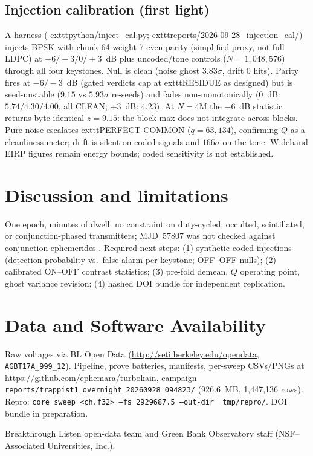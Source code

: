 \documentclass[twocolumn]{aastex631}
\begin{document}
\subsection{Injection calibration (first light)}
\label{sec:inject}
A harness (	exttt{python/inject\_cal.py}; 	exttt{reports/2026-09-28\_injection\_cal/}) injects BPSK with chunk-64 weight-7 even parity (simplified proxy, not full LDPC) at $-6/-3/0/+3$~dB plus uncoded/tone controls ($N=1{,}048{,}576$) through all four keystones. Null is clean (noise ghost $3.83\sigma$, drift 0 hits). Parity fires at $-6/-3$~dB (gated verdicts cap at 	exttt{RESIDUE} as designed) but is seed-unstable ($9.15$ vs $5.93\sigma$ re-seeds) and fades non-monotonically ($0$~dB: $5.74/4.30/4.00$, all CLEAN; $+3$~dB: $4.23$). At $N=4$M the $-6$~dB statistic returns byte-identical $z=9.15$: the block-max does not integrate across blocks. Pure noise escalates 	exttt{PERFECT-COMMON} ($q=63{,}134$), confirming $Q$ as a cleanliness meter; drift is silent on coded signals and $166\sigma$ on the tone. Wideband EIRP figures remain energy bounds; coded sensitivity is not established.

\section{Discussion and limitations}
\label{sec:limits-caveats}

One epoch, minutes of dwell: no constraint on duty-cycled, occulted, scintillated, or conjunction-phased transmitters; MJD~57807 was not checked against conjunction ephemerides \citep{agol2021}. Required next steps: (1) synthetic coded injections (detection probability vs.\ false alarm per keystone; OFF--OFF nulls); (2) calibrated ON--OFF contrast statistics; (3) pre-fold demean, $Q$ operating point, ghost variance revision; (4) hashed DOI bundle for independent replication.

\section*{Data and Software Availability}
Raw voltages via BL Open Data (\url{http://seti.berkeley.edu/opendata}, \texttt{AGBT17A\_999\_12}). Pipeline, prove batteries, manifests, per-sweep CSVs/PNGs at \url{https://github.com/ephemara/turbokain}, campaign \texttt{reports/trappist1\_overnight\_20260928\_094823/} (926.6~MB, 1,447,136 rows). Repro: \texttt{core sweep <ch.f32> --fs 2929687.5 --out-dir \_tmp/repro/}. DOI bundle in preparation.

\begin{acknowledgments}
Breakthrough Listen open-data team and Green Bank Observatory staff (NSF--Associated Universities, Inc.).
\end{acknowledgments}

{}

\end{document}
